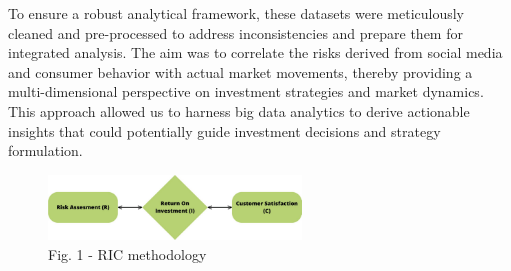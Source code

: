 \begin{multicols}{2}
To ensure a robust analytical framework, these datasets were
meticulously cleaned and pre-processed to address inconsistencies and
prepare them for integrated analysis. The aim was to correlate the risks
derived from social media and consumer behavior with actual market
movements, thereby providing a multi-dimensional perspective on
investment strategies and market dynamics. This approach allowed us to
harness big data analytics to derive actionable insights that could
potentially guide investment decisions and strategy formulation.
\end{multicols}

\begin{figure}[H]
	\centering
	\includegraphics[width=0.6\textwidth]{media/ict2/image9}
	\caption*{Fig. 1 - RIC methodology}
\end{figure}

